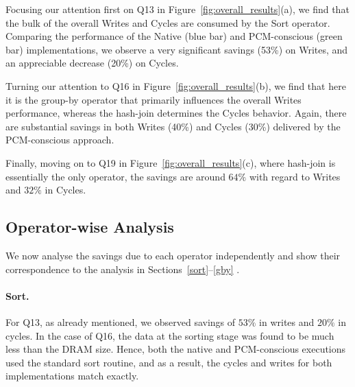 \begin{figure*}[!h]

\centering

\hspace{0mm}
\hspace{0mm}
\caption{Overall performance of queries}
\label{fig:overall_results}
\end{figure*}


Focusing our attention first on Q13 in
Figure~\ref{fig:overall_results}(a), we find that the bulk of the
overall Writes and Cycles are consumed by the Sort operator. Comparing
the performance of the Native (blue bar) and PCM-conscious (green bar)
implementations, we observe a very significant savings (53\%) on Writes,
and an appreciable decrease (20\%) on Cycles.

Turning our attention to Q16 in Figure~\ref{fig:overall_results}(b),
we find that here it is the group-by operator that primarily influences
the overall Writes performance, whereas the hash-join determines the
Cycles behavior. Again, there are substantial savings in both Writes
(40\%) and  Cycles (30\%) delivered by the PCM-conscious approach.

Finally, moving on to Q19 in Figure~\ref{fig:overall_results}(c),
where hash-join is essentially the only operator, the
savings are around $64\%$ with regard to Writes and $32\%$ in Cycles.

\subsection{Operator-wise Analysis}
We now analyse the savings due to each operator independently and show
their correspondence to the analysis in Sections~\ref{sort}--\ref{gby} .

\paragraph{Sort.}
For Q13, as already mentioned, we observed savings of $53\%$ in writes and
$20\%$ in cycles.  In the case of Q16, the data at the sorting stage was
found to be much less than the DRAM size. Hence, both the native and
PCM-conscious executions used the standard sort routine, and as a result,
the cycles and writes for both implementations match exactly.

